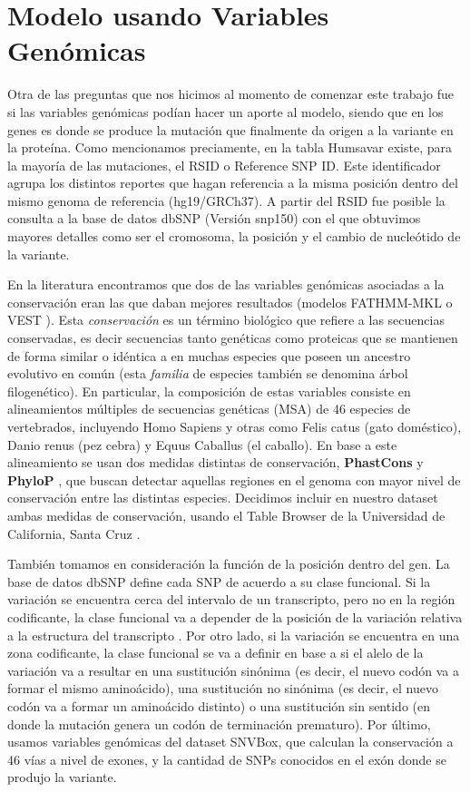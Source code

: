 \section{Modelo usando Variables Genómicas}

Otra de las preguntas que nos hicimos al momento de comenzar este trabajo fue si las variables genómicas podían hacer un aporte al modelo, siendo que en los genes es donde se produce la mutación que finalmente da origen a la variante en la proteína. Como mencionamos preciamente, en la tabla Humsavar existe, para la mayoría de las mutaciones, el RSID o Reference SNP ID. Este identificador agrupa los distintos reportes que hagan referencia a la misma posición dentro del mismo genoma de referencia (hg19/GRCh37). A partir del RSID fue posible la consulta a la base de datos dbSNP (Versión snp150) con el que obtuvimos mayores detalles como ser el cromosoma, la posición y el cambio de nucleótido de la variante. 

En la literatura encontramos que dos de las variables genómicas asociadas a la conservación eran las que daban mejores resultados (modelos FATHMM-MKL \cite{Shihab2015} o VEST \cite{Carter2013}). Esta \textit{conservación} es un término biológico que refiere a las secuencias conservadas, es decir secuencias tanto genéticas como proteicas que se mantienen de forma similar o idéntica a en muchas especies que poseen un ancestro evolutivo en común (esta \textit{familia} de especies también se denomina árbol filogenético). En particular, la composición de estas variables consiste en alineamientos múltiples de secuencias genéticas (MSA) de 46 especies de vertebrados, incluyendo Homo Sapiens y otras como Felis catus (gato doméstico), Danio renus (pez cebra) y Equus Caballus (el caballo). En base a este alineamiento se usan dos medidas distintas de conservación, \textbf{PhastCons} \cite{siepel2005evolutionarily} y \textbf{PhyloP} \cite{Pollard2010}, que buscan detectar aquellas regiones en el genoma con mayor nivel de conservación entre las distintas especies. Decidimos incluir en nuestro dataset ambas medidas de conservación, usando el Table Browser de la Universidad de California, Santa Cruz \cite{Karolchik2004}.

También tomamos en consideración la función de la posición dentro del gen. La base de datos dbSNP define cada SNP de acuerdo a su clase funcional. Si la variación se encuentra cerca del intervalo de un transcripto, pero no en la región codificante, la clase funcional va a depender de la posición de la variación relativa a la estructura del transcripto \cite{Ostell2007}. Por otro lado, si la variación se encuentra en una zona codificante, la clase funcional se va a definir en base a si el alelo de la variación va a resultar en una sustitución sinónima (es decir, el nuevo codón va a formar el mismo aminoácido), una sustitución no sinónima (es decir, el nuevo codón va a formar un aminoácido distinto) o una sustitución sin sentido (en donde la mutación genera un codón de terminación prematuro).
Por último, usamos variables genómicas del dataset SNVBox, que calculan la conservación a 46 vías a nivel de exones, y la cantidad de SNPs conocidos en el exón donde se produjo la variante. 


